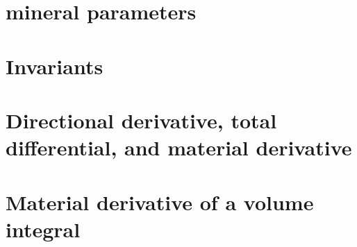 \documentclass[a4paper]{article}
\numberwithin{equation}{section}
\begin{document}
\section{mineral parameters}  %
\newpage %
\section{Invariants \label{app:invariants}}  %
\newpage %
\section{Directional derivative, total differential, and material derivative \label{app:ders}} 
\newpage %
\section{Material derivative of a volume integral \label{app:matdervi}} 





\newpage %
\newpage %
%
\newpage %

\printbibliography
\end{document}
